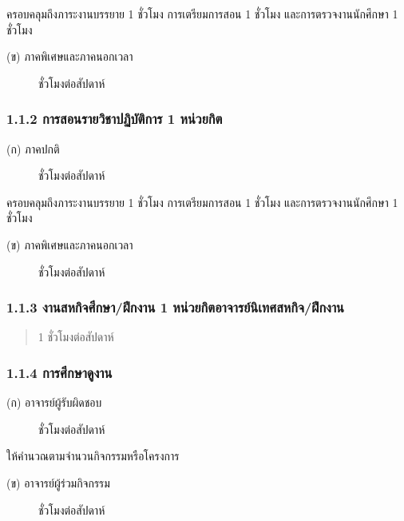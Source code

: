\documentclass[a4paper,12pt,english]{sphinxmanual}
\begin{document}
ครอบคลุมถึงภาระงานบรรยาย 1 ชั่วโมง การเตรียมการสอน 1 ชั่วโมง และการตรวจงานนักศึกษา 1 ชั่วโมง
\begin{description}
\item[{(ข) ภาคพิเศษและภาคนอกเวลา}]  ชั่วโมงต่อสัปดาห์

\end{description}


\subsubsection{1.1.2 การสอนรายวิชาปฏิบัติการ 1 หน่วยกิต}
\label{\detokenize{workload_rubric:id5}}\begin{description}
\item[{(ก) ภาคปกติ}]  ชั่วโมงต่อสัปดาห์

\end{description}

ครอบคลุมถึงภาระงานบรรยาย 1 ชั่วโมง การเตรียมการสอน 1 ชั่วโมง และการตรวจงานนักศึกษา 1 ชั่วโมง
\begin{description}
\item[{(ข) ภาคพิเศษและภาคนอกเวลา}]  ชั่วโมงต่อสัปดาห์

\end{description}


\subsubsection{1.1.3 งานสหกิจศึกษา/ฝึกงาน 1 หน่วยกิตอาจารย์นิเทศสหกิจ/ฝึกงาน}
\label{\detokenize{workload_rubric:id6}}\begin{quote}

1 ชั่วโมงต่อสัปดาห์
\end{quote}


\subsubsection{1.1.4 การศึกษาดูงาน}
\label{\detokenize{workload_rubric:id7}}\begin{description}
\item[{(ก) อาจารย์ผู้รับผิดชอบ}]  ชั่วโมงต่อสัปดาห์

\end{description}

ให้คำนวณตามจำนวนกิจกรรมหรือโครงการ
\begin{description}
\item[{(ข) อาจารย์ผู้ร่วมกิจกรรม}]  ชั่วโมงต่อสัปดาห์

\end{description}
\end{document}

